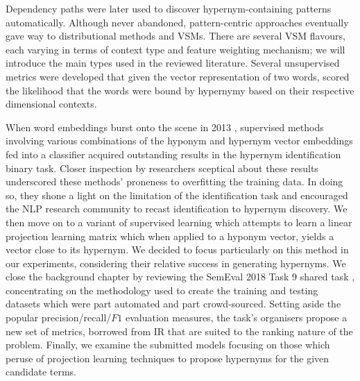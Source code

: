 Dependency paths were later used to discover hypernym-containing patterns automatically.  Although never abandoned, pattern-centric approaches eventually gave way to distributional methods and \acl{VSM}s.  There are several \ac{VSM} flavours, each varying in terms of context type and feature weighting mechanism; we will introduce the main types used in the reviewed literature.  Several unsupervised metrics were developed that given the vector representation of two words, scored the likelihood that the words were bound by hypernymy based on their respective dimensional contexts.

When word embeddings burst onto the scene in 2013 \citep{mikolov2013distributed}, supervised methods involving various combinations of the hyponym and hypernym vector embeddings fed into a classifier acquired outstanding results in the hypernym identification binary task.  Closer inspection by researchers sceptical about these results underscored these methods’ proneness to overfitting the training data. In doing so, they shone a light on the limitation of the identification task and encouraged the NLP research community to recast identification to hypernym discovery.  We then move on to a variant of supervised learning which attempts to learn a linear projection learning matrix which when applied to a hyponym vector, yields a vector close to its hypernym.  We decided to focus particularly on this method in our experiments, considering their relative success in generating hypernyms.  
We close the background chapter by reviewing the SemEval 2018 Task 9 shared task \citep{camacho2018semeval}, concentrating on the methodology used to create the training and testing datasets which were part automated and part crowd-sourced.  Setting aside the popular precision/recall/\(F1\) evaluation measures, the task’s organisers propose a new set of metrics, borrowed from \ac{IR} that are suited to the ranking nature of the problem.  Finally, we examine the submitted models focusing on those which peruse of projection learning techniques to propose hypernyms for the given candidate terms.




